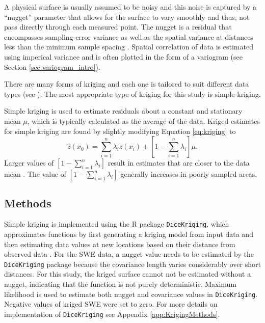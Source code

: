 \documentclass{sfuthesis}
\begin{document}
A physical surface is usually assumed to be noisy and this noise is captured by a ``nugget'' parameter that allows for the surface to vary smoothly and thus, not pass directly through each measured point. The nugget is a residual that encompasses sampling-error variance as well as the spatial variance at distances less than the minimum sample spacing \citep{Li2008}. Spatial correlation of data is estimated using imperical variance and is often plotted in the form of a variogram (see Section \ref{sec:variogram_intro}).  

There are many forms of kriging and each one is tailored to suit different data types (see \cite{Li2014}). The most appropriate type of kriging for this study is simple kriging. 

Simple kriging is used to estimate residuals about a constant and stationary mean $\mu$, which is typically calculated as the average of the data. Kriged estimates for simple kriging are found by slightly modifying Equation \ref{eq:kriging} to 
\begin{equation}
\hat{z}(x_0) = \sum_{i=1}^{n} \lambda_i z(x_i) +\left[1-\sum_{i=1}^{n} \lambda_i \right]\mu.
\end{equation}
Larger values of $\left[1-\sum_{i=1}^{n} \lambda_i \right]$ result in estimates that are closer to the data mean \citep{Li2008}. The value of $\left[1-\sum_{i=1}^{n} \lambda_i \right]$ generally increases in poorly sampled areas. 

\subsection{Methods}
\label{sec:kriging_methods}

Simple kriging is implemented using the R package \texttt{DiceKriging}, which approximates functions by first generating a kriging model from input data and then estimating data values at new locations based on their distance from observed data \citep{Roustant2012}. For the SWE data, a nugget value needs to be estimated by the \texttt{DiceKriging} package because the covariance length varies considerably over short distances. For this study, the kriged surface cannot not be estimated without a nugget, indicating that the function is not purely deterministic. Maximum likelihood is used to estimate both nugget and covariance values in \texttt{DiceKriging}. Negative values of kriged SWE were set to zero. For more details on implementation of \texttt{DiceKriging} see Appendix \ref{app:KrigingMethods}.
\end{document}
